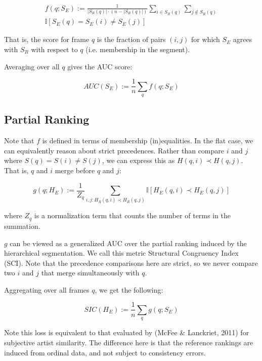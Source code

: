 \documentclass{article}
\begin{document}
\begin{multline}
f(q ; S_E) := \frac{1}{|S_R(q)|\cdot (n - |S_R(q)|)} \sum_{i \in S_R(q)} \sum_{j \notin S_R(q)} \\ \mathbb{I}\left[ S_E(q) = S_E(i) \neq S_E(j) \right]
\end{multline}

That is, the score for frame $q$ is the fraction of pairs $(i, j)$ for which $S_E$ agrees with $S_R$ with respect to $q$ (i.e. membership in the segment).

Averaging over all $q$ gives the AUC score:

\begin{equation}
AUC(S_E) := \frac{1}{n} \sum_q f(q ; S_E)
\end{equation}

\subsection{Partial Ranking}

Note that $f$ is defined in terms of membership (in)equalities.
In the flat case, we can equivalently reason about strict precedences.
Rather than compare $i$ and $j$ where $S(q) = S(i) \neq S(j)$, we can express this as $H(q, i) \prec H(q, j)$.
That is, $q$ and $i$ merge before $q$ and $j$:

\begin{equation}
g(q ; H_E) := \frac{1}{Z_q} \sum_{i,j : H_R(q, i) \prec H_R(q, j)}  \mathbb{I}\left[ H_E(q, i) \prec H_E(q, j) \right]
\end{equation}

where $Z_q$ is a normalization term that counts the number of terms in the summation.

$g$ can be viewed as a generalized AUC over the partial ranking induced by the hierarchical segmentation.
We call this metric Structural Congruency Index (SCI).
Note that the precedence comparisons here are strict, so we never compare two $i$ and $j$ that merge simultaneously with $q$.

Aggregating over all frames $q$, we get the following:

\begin{equation}
SIC(H_E) := \frac{1}{n} \sum_q g(q ; S_E)
\end{equation}

Note this loss is equivalent to that evaluated by (McFee \& Lanckriet, 2011) for subjective artist similarity.
The difference here is that the reference rankings are induced from ordinal data, and not subject to consistency errors.
\end{document}
